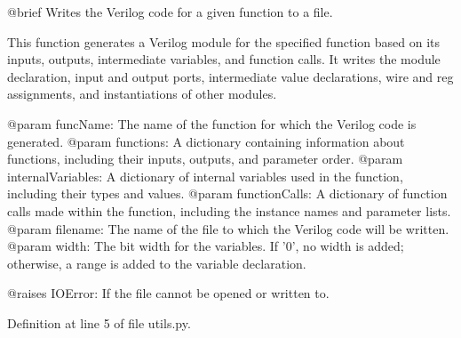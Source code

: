\begin{DoxyVerb}@brief Writes the Verilog code for a given function to a file.

This function generates a Verilog module for the specified function based on its inputs, outputs,
intermediate variables, and function calls. It writes the module declaration, input and output ports,
intermediate value declarations, wire and reg assignments, and instantiations of other modules.

@param funcName: The name of the function for which the Verilog code is generated.
@param functions: A dictionary containing information about functions, including their inputs, outputs, and parameter order.
@param internalVariables: A dictionary of internal variables used in the function, including their types and values.
@param functionCalls: A dictionary of function calls made within the function, including the instance names and parameter lists.
@param filename: The name of the file to which the Verilog code will be written.
@param width: The bit width for the variables. If '0', no width is added; otherwise, a range is added to the variable declaration.

@raises IOError: If the file cannot be opened or written to.
\end{DoxyVerb}
 

Definition at line 5 of file utils.\+py.



